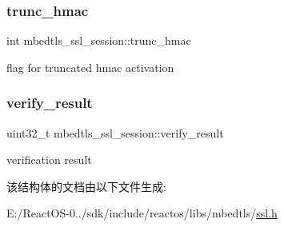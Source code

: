 \subsubsection{\texorpdfstring{trunc\+\_\+hmac}{trunc\_hmac}}
{\footnotesize\ttfamily int mbedtls\+\_\+ssl\+\_\+session\+::trunc\+\_\+hmac}

flag for truncated hmac activation \mbox{\label{structmbedtls__ssl__session_a7767cf999b47eaa545fb6a86b3447a20}} 
\subsubsection{\texorpdfstring{verify\+\_\+result}{verify\_result}}
{\footnotesize\ttfamily uint32\+\_\+t mbedtls\+\_\+ssl\+\_\+session\+::verify\+\_\+result}

verification result 

该结构体的文档由以下文件生成\+:\begin{DoxyCompactItemize}
\item 
E\+:/\+React\+O\+S-\/0../sdk/include/reactos/libs/mbedtls/\hyperlink{ssl_8h}{ssl.\+h}\end{DoxyCompactItemize}
